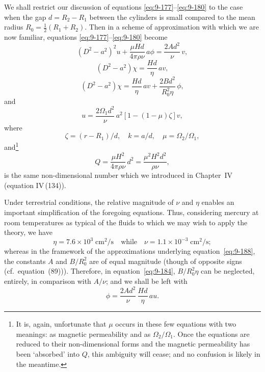 We shall restrict our discussion of equations \eqref{eq:9-177}--\eqref{eq:9-180} to the case when the gap $d = R_2 - R_1$ between the cylinders is small compared to the mean radius $R_0 = \frac{1}{2}(R_1 + R_2)$. Then in a scheme of approximation with which we are now familiar, equations \eqref{eq:9-177}--\eqref{eq:9-180} become
\begin{equation}
(D^2 - a^2)^2 u + \frac{\mu Hd}{4\pi\rho\nu}\, a\phi = \frac{2Ad^2}{\nu}\, v, \label{eq:9-182}
\end{equation}
\begin{equation}
(D^2 - a^2)\chi = \frac{Hd}{\eta}\, av, \label{eq:9-183}
\end{equation}
\begin{equation}
(D^2 - a^2)\chi = \frac{Hd}{\eta}\, av + \frac{2Bd^2}{R_0^2\eta}\, \phi, \label{eq:9-184}
\end{equation}
and
\begin{equation}
[(D^2 - a^2)^2 + Qa^2]u = \frac{2\Omega_1 d^2}{\nu}\, a^2[1 - (1-\mu)\zeta]v, \label{eq:9-185}
\end{equation}
where
\begin{equation}
\zeta = (r - R_1)/d, \quad k = a/d, \quad \mu = \Omega_2/\Omega_1, \label{eq:9-186}
\end{equation}
and\footnote{It is, again, unfortunate that $\mu$ occurs in these few equations with two meanings: as magnetic permeability and as $\Omega_2/\Omega_1$. Once the equations are reduced to their non-dimensional forms and the magnetic permeability has been `absorbed' into $Q$, this ambiguity will cease; and no confusion is likely in the meantime.}
\begin{equation}
Q = \frac{\mu H^2}{4\pi\rho\nu}\, d^2 = \frac{\mu^2 H^2 d^2}{\rho\nu}, \label{eq:9-187}
\end{equation}
is the same non-dimensional number which we introduced in Chapter~IV (equation IV\,(134)).

Under terrestrial conditions, the relative magnitude of $\nu$ and $\eta$ enables an important simplification of the foregoing equations. Thus, considering mercury at room temperatures as typical of the fluids to which we may wish to apply the theory, we have
\begin{equation}
\eta = 7.6 \times 10^3\;\text{cm}^2/\text{s}\quad \text{while}\quad \nu = 1.1 \times 10^{-3}\;\text{cm}^2/\text{s}; \label{eq:9-189}
\end{equation}
whereas in the framework of the approximations underlying equation~\eqref{eq:9-188}, the constants $A$ and $B/R_0^2$ are of equal magnitude (though of opposite signs (cf.\ equation~(89))). Therefore, in equation~\eqref{eq:9-184}, $B/R_0^2 \eta$ can be neglected, entirely, in comparison with $A/\nu$; and we shall be left with
\begin{equation}
[(D^2 - a^2)^2 + Qa^2]\phi = \frac{2Ad^2}{\nu}\,\frac{Hd}{\eta}\, au. \label{eq:9-190}
\end{equation}

